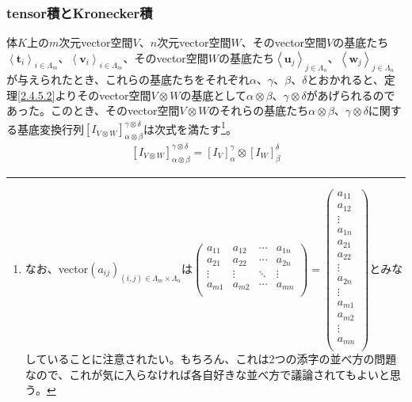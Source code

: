 \documentclass[dvipdfmx]{jsarticle}
\begin{document}
\subsubsection{tensor積とKronecker積}%
\begin{thm}\label{2.4.7.2}
体$K$上の$m$次元vector空間$V$、$n$次元vector空間$W$、そのvector空間$V$の基底たち$\left\langle \mathbf{t}_{i} \right\rangle_{i \in \varLambda_{m}}$、$\left\langle \mathbf{v}_{i} \right\rangle_{i \in \varLambda_{m}}$、そのvector空間$W$の基底たち$\left\langle \mathbf{u}_{j} \right\rangle_{j \in \varLambda_{n}}$、$\left\langle \mathbf{w}_{j} \right\rangle_{j \in \varLambda_{n}}$が与えられたとき、これらの基底たちをそれぞれ$\alpha$、$\gamma$、$\beta$、$\delta$とおかれると、定理\ref{2.4.5.2}よりそのvector空間$V \otimes W$の基底として$\alpha \otimes \beta$、$\gamma \otimes \delta$があげられるのであった。このとき、そのvector空間$V \otimes W$のそれらの基底たち$\alpha \otimes \beta$、$\gamma \otimes \delta$に関する基底変換行列$\left[ I_{V \otimes W} \right]^{\gamma \otimes \delta}_{\alpha \otimes \beta}$は次式を満たす\footnote{なお、vector$\left( a_{ij} \right)_{(i,j) \in \varLambda_{m} \times \varLambda_{n}}$は$\begin{pmatrix}
  a_{11} & a_{12} & \cdots & a_{1n} \\
  a_{21} & a_{22} & \cdots & a_{2n} \\
   \vdots & \vdots & \ddots & \vdots \\
  a_{m1} & a_{m2} & \cdots & a_{mn} \\
  \end{pmatrix} = \begin{pmatrix}
  a_{11} \\
  a_{12} \\
   \vdots \\
  a_{1n} \\
  a_{21} \\
  a_{22} \\
   \vdots \\
  a_{2n} \\
   \vdots \\
  a_{m1} \\
  a_{m2} \\
   \vdots \\
  a_{mn} \\
  \end{pmatrix}$とみなしていることに注意されたい。もちろん、これは2つの添字の並べ方の問題なので、これが気に入らなければ各自好きな並べ方で議論されてもよいと思う。}。
\begin{align*}
\left[ I_{V \otimes W} \right]^{\gamma \otimes \delta}_{\alpha \otimes \beta} = \left[ I_{V} \right]^{\gamma}_{\alpha} \otimes \left[ I_{W} \right]^{\delta}_{\beta}
\end{align*}
\end{thm}
\end{document}
